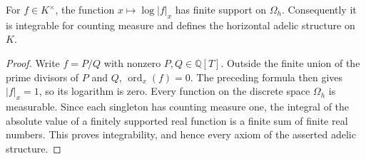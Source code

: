 \begin{lemma}
\label{lem:rational-horizontal-log-integrable}
\leanok
For $f\in K^\times$, the function $x\mapsto\log|f|_x$ has finite
support on $\Omega_h$. Consequently it is integrable for counting
measure and defines the horizontal adelic structure on $K$.
\end{lemma}
\begin{proof}
Write $f=P/Q$ with nonzero $P,Q\in\mathbb Q[T]$.
Outside the finite union of the prime divisors of $P$ and $Q$,
$\operatorname{ord}_x(f)=0$. The preceding formula then gives
$|f|_x=1$, so its logarithm is zero.
Every function on the discrete space $\Omega_h$ is measurable.
Since each singleton has counting measure one, the integral of the
absolute value of a finitely supported real function is a finite sum
of finite real numbers. This proves integrability, and hence every
axiom of the asserted adelic structure.
\end{proof}

